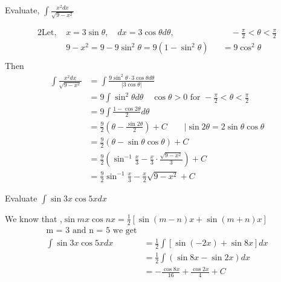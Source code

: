 \begin{exercise}
 Evaluate,	$\int \frac{x^{2} d x}{\sqrt{9-x^{2}}}$
\end{exercise}
\begin{answer}
		\begin{alignat*}{2}
		\text{Let, }&x=3 \sin \theta, \quad d x=3 \cos \theta d \theta, &&\quad-\frac{\pi}{2}<\theta<\frac{\pi}{2} \\
		&9-x^{2}=9-9 \sin ^{2} \theta=9\left(1-\sin ^{2} \theta\right)&&=9 \cos ^{2} \theta\\
	\end{alignat*}
	Then
	\begin{align*}
	\int \frac{x^{2} d x}{\sqrt{9-x^{2}}} &=\int \frac{9 \sin ^{2} \theta \cdot 3 \cos \theta d \theta}{|3 \cos \theta|} \\
	&=9 \int \sin ^{2} \theta d \theta \quad \cos \theta>0 \text { for }-\frac{\pi}{2}<\theta<\frac{\pi}{2} \\
	&=9 \int \frac{1-\cos 2 \theta}{2} d \theta \\
	&=\frac{9}{2}\left(\theta-\frac{\sin 2 \theta}{2}\right)+C \qquad |\sin 2 \theta=2 \sin \theta \cos \theta \\
	&=\frac{9}{2}(\theta-\sin \theta \cos \theta)+C \quad \\
	&=\frac{9}{2}\left(\sin ^{-1} \frac{x}{3}-\frac{x}{3} \cdot \frac{\sqrt{9-x^{2}}}{3}\right)+C  \\
	&=\frac{9}{2} \sin ^{-1} \frac{x}{3}-\frac{x}{2} \sqrt{9-x^{2}}+C
	\end{align*}
	
\end{answer}
\begin{exercise}
	Evaluate
	$\int \sin 3 x \cos 5 x d x$
\end{exercise}
\begin{answer}
	We know that ,\quad $\sin m x \cos n x=\frac{1}{2}[\sin (m-n) x+\sin (m+n) x]$\\
	\begin{align*}
	\text{m = 3 and n = 5 we get}\\
		\int \sin 3 x \cos 5 x d x &=\frac{1}{2} \int[\sin (-2 x)+\sin 8 x] d x \\
		&=\frac{1}{2} \int(\sin 8 x-\sin 2 x) d x \\
		&=-\frac{\cos 8 x}{16}+\frac{\cos 2 x}{4}+C
	\end{align*}
\end{answer}

